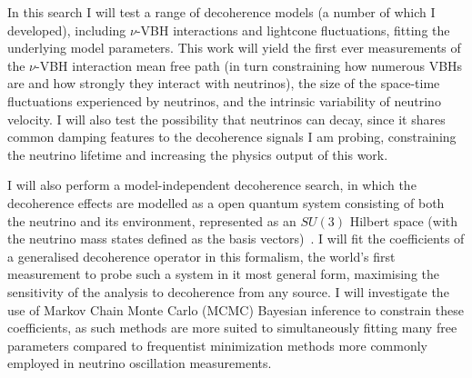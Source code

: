 \documentclass[a4paper,11pt]{article}
\begin{document}
In this search I will test a range of decoherence models (a number of which I developed), including $\nu$-VBH interactions and lightcone fluctuations, fitting the underlying model parameters. This work will yield the first ever measurements of the $\nu$-VBH interaction mean free path (in turn constraining how numerous VBHs are and how strongly they interact with neutrinos), the size of the space-time fluctuations experienced by neutrinos, and the intrinsic variability of neutrino velocity. I will also test the possibility that neutrinos can decay, since it shares common damping features to the decoherence signals I am probing, constraining the neutrino lifetime and increasing the physics output of this work.


I will also perform a model-independent decoherence search, in which the decoherence effects are modelled as a open quantum system consisting of both the neutrino and its environment, represented as an $SU(3)$ Hilbert space (with the neutrino mass states defined as the basis vectors)~\cite{lindblad1976, Benatti_2000, gago2002study, PhysRevLett.85.1166}. I will fit the coefficients of a generalised decoherence  operator in this formalism, the world's first measurement to probe such a system in it most general form, maximising the sensitivity of the analysis to decoherence from any source. I will investigate the use of Markov Chain Monte Carlo (MCMC) Bayesian inference to constrain these coefficients, as such methods are more suited to simultaneously fitting many free parameters compared to frequentist minimization methods more commonly employed in neutrino oscillation measurements.


\end{document}
